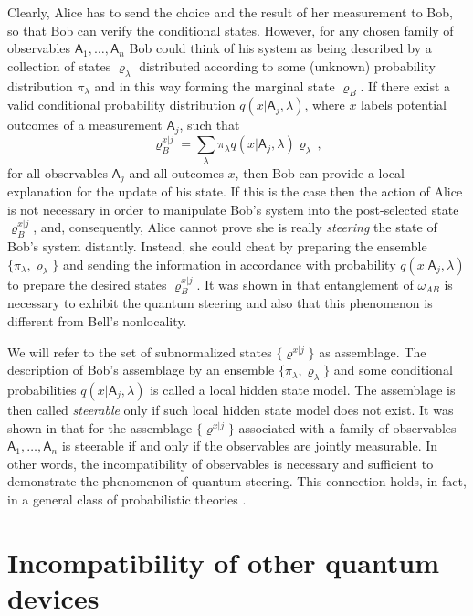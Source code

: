 \documentclass[12pt]{iopart}
\theoremstyle{definition}
\newcommand{\Ao}{\mathsf{A}}%
\begin{document}
{Clearly, Alice has to send the choice and the result of her measurement 
to Bob, so that Bob can verify the conditional states. However, for any chosen
family of observables $\Ao_1,\dots,\Ao_n$ Bob could think 
of his system as being described by a collection of states $\varrho_\lambda$ 
distributed according to some (unknown) probability distribution $\pi_\lambda$ and in this way forming the marginal state $\varrho_B$. 
If there exist a valid conditional probability distribution $q(x|\Ao_j,\lambda)$, where $x$ labels potential 
outcomes of a measurement $\Ao_j$, such that
\begin{equation}
\varrho_B^{x|j}=\sum_\lambda \pi_\lambda q(x|\Ao_j,\lambda) \varrho_\lambda\,,
\end{equation}
for all observables $\Ao_j$ and all outcomes $x$, then Bob can provide a local explanation for the update of his state. 
If this is the case
then the action of Alice is not necessary in order to manipulate Bob's 
system into the post-selected state $\varrho_B^{x|j}$, and, consequently,
Alice cannot prove she is really \emph{steering} the state of Bob's system
distantly. 
Instead, she could cheat by preparing the ensemble 
$\{\pi_\lambda,\varrho_\lambda\}$ and sending the information in accordance
with probability $q(x|\Ao_j,\lambda)$ to prepare the desired states 
$\varrho_B^{x|j}$. 
It was shown in \cite{WiJoDo07} that entanglement 
of $\omega_{AB}$ is necessary to exhibit the quantum steering 
and also that this phenomenon is different from Bell's nonlocality.

We will refer to the set of subnormalized states
$\{\varrho^{x|j}\}$ as assemblage. 
The description of Bob's assemblage by an ensemble $\{\pi_\lambda,\varrho_\lambda\}$ and some 
conditional probabilities $q(x|\Ao_j,\lambda)$ is called 
a local hidden state model. The assemblage is then
called \emph{steerable} only if such local hidden state 
model does not exist.
It was shown in \cite{QuVeBr14,UoMoGu14} that
for the assemblage $\{\varrho^{x|j}\}$ associated with a family of observables
$\Ao_1,\dots,\Ao_n$ is steerable if and only if the observables are jointly measurable. 
In other words, the incompatibility of observables
is necessary and sufficient to demonstrate the phenomenon of quantum 
steering. 
This connection holds, in fact, in a general class of probabilistic theories \cite{Banik15}.

\section{Incompatibility of other quantum devices}\label{sec:other}

}
\end{document}
